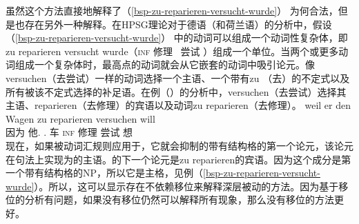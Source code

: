 \z
虽然这个方法直接地解释了（\ref{bsp-zu-reparieren-versucht-wurde}） 为何合法，但是也存在另外一种解释。在HPSG理论对于德语（和荷兰语）的分析中，假设（\ref{bsp-zu-reparieren-versucht-wurde}） 中的动词可以组成一个动词性复杂体，即zu reparieren versucht wurde（\textsc{inf} 修理 \, 尝试 \passivepst）组成一个单位。当两个或更多动词组成一个复杂体时，最高点的动词就会从它嵌套的动词中吸引论元\citep{HN89a,HN94a,BvN98}。像versuchen（去尝试）一样的动词选择一个主语、一个带有zu （去）的不定式以及所有被该不定式选择的补足语。在例（）的分析中，versuchen（去尝试）选择其主语、reparieren（去修理）的宾语以及动词zu reparieren（去修理）。
\ea
\gll weil er den Wagen zu reparieren versuchen will\\
     因为 他.\nom{} .\acc{} 车 \textsc{inf} 修理 尝试 想\\
\z
现在，如果被动词汇规则应用于，它就会抑制的带有结构格的第一个论元，该论元在句法上实现为的主语。的下一个论元是zu reparieren的宾语。因为这个成分是第一个带有结构格的NP，所以它是主格，见例（\ref{bsp-zu-reparieren-versucht-wurde}）。所以，这可以显示存在不依赖移位来解释深层被动的方法。因为基于移位的分析有问题，如果没有移位仍然可以解释所有现象，那么没有移位的方法更好。
